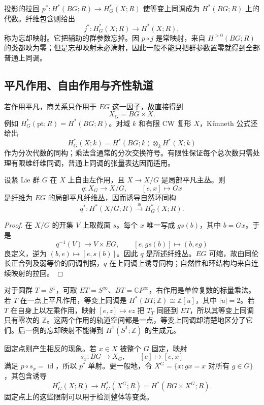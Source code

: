 投影的拉回 \(p^*:H^*(BG;R)\to H_G^*(X;R)\) 使等变上同调成为 \(H^*(BG;R)\) 上的代数。纤维包含则给出
\[
	j^*:H_G^*(X;R)\longrightarrow H^*(X;R),
\]
称为忘却映射。它把辅助的群参数忘掉。因 \(p\circ j\) 是常映射，来自 \(H^{>0}(BG;R)\) 的类都映为零；但是忘却映射未必满射，因此一般不能只把群参数置零就得到全部普通上同调。

\subsection{平凡作用、自由作用与齐性轨道}
\label{g2:subsec:C01:02}

若作用平凡，商关系只作用于 \(EG\) 这一因子，故直接得到
\[
	X_G=BG\times X.
\]
例如 \(H_G^*(\mathrm{pt};R)=H^*(BG;R)\)。对域 \(k\) 和有限 CW 复形 \(X\)，Künneth 公式还给出
\[
	H_G^*(X;k)=H^*(BG;k)\otimes_kH^*(X;k)
\]
作为分次代数的同构；乘法含通常的分次交换符号。有限性保证每个总次数只需处理有限维纤维同调，普通上同调的张量表达因而适用。

\begin{proposition}\label{g2:prop:free-action-borel-quotient}
	设紧 Lie 群 \(G\) 在 \(X\) 上自由左作用，且 \(X\to X/G\) 是局部平凡主丛。则
	\[
		q:X_G\longrightarrow X/G,\qquad[e,x]\longmapsto Gx
	\]
	是纤维为 \(EG\) 的局部平凡纤维丛，因而诱导自然环同构
	\[
		q^*:H^*(X/G;R)\xrightarrow{\ \cong\ }H_G^*(X;R).
	\]
\end{proposition}
\begin{proof}
	在 \(X/G\) 的开集 \(V\) 上取截面 \(s\)。每个 \(x\) 唯一写成 \(g s(b)\)，其中 \(b=Gx\)。于是
	\[
		q^{-1}(V)\longrightarrow V\times EG,\qquad
		[e,g s(b)]\longmapsto(b,eg)
	\]
	良定义，逆为 \((b,e)\mapsto[e,s(b)]\)。因此 \(q\) 是所述纤维丛。\(EG\) 可缩，故由同伦长正合列及弱等价的同调判据，\(q\) 在上同调上诱导同构；自然性和环结构均来自连续映射的拉回。
\end{proof}

对于圆群 \(T=S^1\)，可取 \(ET=S^\infty\)、\(BT=\mathbb CP^\infty\)，右作用是单位复数的标量乘法。若 \(T\) 在一点上平凡作用，等变上同调是 \(H^*(BT;\mathbb Z)\cong\mathbb Z[u]\)，其中 \(|u|=2\)。若 \(T\) 在自身上以左乘作用，映射 \([e,z]\mapsto ez\) 把 \(T_T\) 同胚到 \(ET\)，所以其等变上同调只有零次的 \(\mathbb Z\)。这两个作用的轨道空间都是一点，等变上同调却清楚地区分了它们。后一例的忘却映射不能得到 \(H^1(S^1;\mathbb Z)\) 的生成元。

\ProseParagraphBreak

固定点则产生相反的现象。若 \(x\in X\) 被整个 \(G\) 固定，映射
\[
	s_x:BG\longrightarrow X_G,\qquad[e]\longmapsto[e,x]
\]
满足 \(p\circ s_x=\operatorname{id}\)，所以 \(p^*\) 单射。更一般地，令 \(X^G=\{x:gx=x\text{ 对所有 }g\in G\}\)，其包含诱导
\[
	H_G^*(X;R)\longrightarrow H_G^*(X^G;R)
	=H^*(BG\times X^G;R).
\]
固定点上的这些限制可以用于检测整体等变类。

